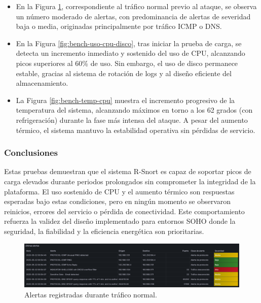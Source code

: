 \documentclass[11pt,a4paper,twoside]{report}
\begin{document}
\begin{itemize}
	\item En la Figura \ref{fig:bench-alertas-normales}, correspondiente al tráfico normal previo al ataque, se observa un número moderado de alertas, con predominancia de alertas de severidad baja o media, originadas principalmente por tráfico ICMP o DNS.
	
	\item En la Figura \ref{fig:bench-uso-cpu-disco}, tras iniciar la prueba de carga, se detecta un incremento inmediato y sostenido del uso de CPU, alcanzando picos superiores al 60\% de uso. Sin embargo, el uso de disco permanece estable, gracias al sistema de rotación de logs y al diseño eficiente del almacenamiento.
	
	\item La Figura \ref{fig:bench-temp-cpu} muestra el incremento progresivo de la temperatura del sistema, alcanzando máximos en torno a los 62 grados (con refrigeración) durante la fase más intensa del ataque. A pesar del aumento térmico, el sistema mantuvo la estabilidad operativa sin pérdidas de servicio.
	
\end{itemize}

\subsubsection*{Conclusiones}
Estas pruebas demuestran que el sistema R-Snort es capaz de soportar picos de carga elevados durante periodos prolongados sin comprometer la integridad de la plataforma. El uso sostenido de CPU y el aumento térmico son respuestas esperadas bajo estas condiciones, pero en ningún momento se observaron reinicios, errores del servicio o pérdida de conectividad. Este comportamiento refuerza la validez del diseño implementado para entornos SOHO donde la seguridad, la fiabilidad y la eficiencia energética son prioritarias.

\begin{figure}[H]
	\centering
	\includegraphics[width=\textwidth]{benchmark/3.png}
	\caption{Alertas registradas durante tráfico normal.}
	\label{fig:bench-alertas-normales}
\end{figure}
\end{document}
